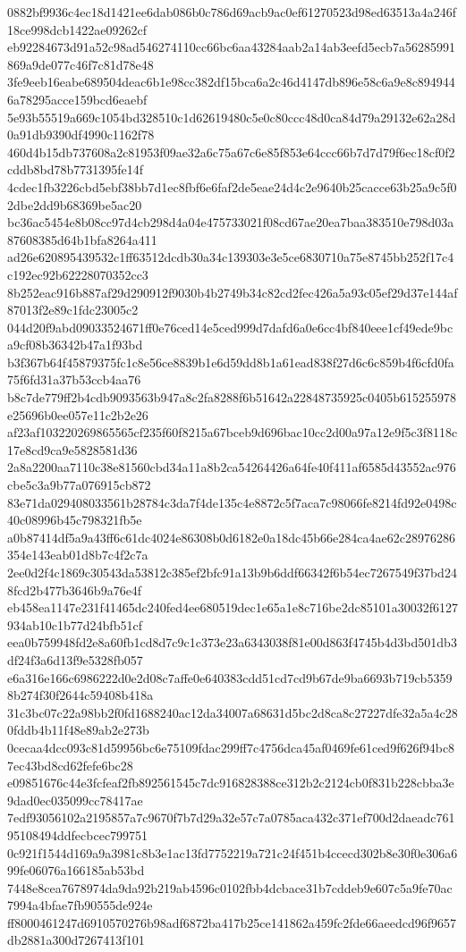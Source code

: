 {0882bf9936c4ec18d1421ee6dab086b0c786d69acb9ac0ef61270523d98ed63513a4a246f18ce998dcb1422ae09262cf
eb92284673d91a52c98ad546274110cc66bc6aa43284aab2a14ab3eefd5ecb7a56285991869a9de077c46f7c81d78e48
3fe9eeb16eabe689504deac6b1e98cc382df15bca6a2c46d4147db896e58c6a9e8c8949446a78295acce159bcd6eaebf
5e93b55519a669c1054bd328510c1d62619480c5e0c80ccc48d0ca84d79a29132e62a28d0a91db9390df4990c1162f78
460d4b15db737608a2c81953f09ae32a6c75a67c6e85f853e64ccc66b7d7d79f6ec18cf0f2cddb8bd78b7731395fe14f
4cdec1fb3226cbd5ebf38bb7d1ec8fbf6e6faf2de5eae24d4c2e9640b25cacce63b25a9c5f02dbe2dd9b68369be5ac20
bc36ac5454e8b08cc97d4cb298d4a04e475733021f08cd67ae20ea7baa383510e798d03a87608385d64b1bfa8264a411
ad26e620895439532c1ff63512dcdb30a34c139303e3e5ce6830710a75e8745bb252f17c4c192ec92b62228070352cc3
8b252eac916b887af29d290912f9030b4b2749b34c82cd2fec426a5a93c05ef29d37e144af87013f2e89c1fdc23005c2
044d20f9abd09033524671ff0e76ced14e5ced999d7dafd6a0e6cc4bf840eee1cf49ede9bca9cf08b36342b47a1f93bd
b3f367b64f45879375fc1c8e56ce8839b1e6d59dd8b1a61ead838f27d6c6c859b4f6cfd0fa75f6fd31a37b53ccb4aa76
b8c7de779ff2b4cdb9093563b947a8c2fa8288f6b51642a22848735925c0405b615255978e25696b0ee057e11c2b2e26
af23af103220269865565cf235f60f8215a67bceb9d696bac10cc2d00a97a12e9f5c3f8118c17e8cd9ca9e5828581d36
2a8a2200aa7110c38e81560cbd34a11a8b2ca54264426a64fe40f411af6585d43552ac976cbe5c3a9b77a076915cb872
83e71da029408033561b28784c3da7f4de135c4e8872c5f7aca7c98066fe8214fd92e0498c40c08996b45c798321fb5e
a0b87414df5a9a43ff6c61dc4024e86308b0d6182e0a18dc45b66e284ca4ae62c28976286354e143eab01d8b7c4f2c7a
2ee0d2f4c1869c30543da53812c385ef2bfc91a13b9b6ddf66342f6b54ec7267549f37bd248fcd2b477b3646b9a76e4f
eb458ea1147e231f41465dc240fed4ee680519dec1e65a1e8c716be2dc85101a30032f6127934ab10c1b77d24bfb51cf
eea0b759948fd2e8a60fb1cd8d7c9c1c373e23a6343038f81e00d863f4745b4d3bd501db3df24f3a6d13f9e5328fb057
e6a316e166c6986222d0e2d08c7affe0e640383cdd51cd7cd9b67de9ba6693b719cb53598b274f30f2644c59408b418a
31c3bc07c22a98bb2f0fd1688240ac12da34007a68631d5bc2d8ca8c27227dfe32a5a4c280fddb4b11f48e89ab2e273b
0cecaa4dcc093c81d59956bc6e75109fdac299ff7c4756dca45af0469fe61ced9f626f94bc87ec43bd8cd62fefe6bc28
e09851676c44e3fcfeaf2fb892561545c7dc916828388ce312b2c2124cb0f831b228cbba3e9dad0ec035099cc78417ae
7edf93056102a2195857a7c9670f7b7d29a32e57c7a0785aca432c371ef700d2daeadc76195108494ddfecbcec799751
0c921f1544d169a9a3981c8b3e1ac13fd7752219a721c24f451b4ccecd302b8e30f0e306a699fe06076a166185ab53bd
7448e8cea7678974da9da92b219ab4596c0102fbb4dcbace31b7cddeb9e607c5a9fe70ac7994a4bfae7fb90555de924e
ff8000461247d6910570276b98adf6872ba417b25ce141862a459fc2fde66aeedcd96f9657db2881a300d7267413f101
}
